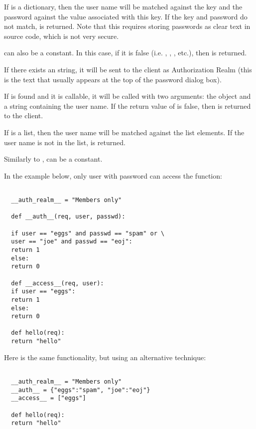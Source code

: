 If  is a dictionary, then the user name will be
matched against the key and the password against the value associated
with this key. If the key and password do not match, 
 is returned. Note that this requires
storing passwords as clear text in source code, which is not very secure.

 can also be a constant. In this case, if it is false
(i.e. , , , etc.), then 
 is returned.

If there exists an  string, it will be sent
to the client as Authorization Realm (this is the text that usually
appears at the top of the password dialog box).

If  is found and it is callable, it will be called
with two arguments: the  object and a string containing
the user name. If the return value of  is false, then
 is returned to the client.

If  is a list, then the user name will be matched
against the list elements. If the user name is not in the list, 
 is returned.

Similarly to ,  can be a constant.

In the example below, only user  with password 
can access the  function:

\begin{verbatim}

  __auth_realm__ = "Members only"

  def __auth__(req, user, passwd):

  if user == "eggs" and passwd == "spam" or \
  user == "joe" and passwd == "eoj":
  return 1
  else:
  return 0

  def __access__(req, user):
  if user == "eggs":
  return 1
  else:
  return 0

  def hello(req):
  return "hello"

\end{verbatim}

Here is the same functionality, but using an alternative technique:

\begin{verbatim}

  __auth_realm__ = "Members only"
  __auth__ = {"eggs":"spam", "joe":"eoj"}
  __access__ = ["eggs"]

  def hello(req):
  return "hello"

\end{verbatim}

